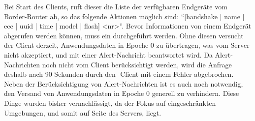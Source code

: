Bei Start des Clients, ruft dieser die Liste der verfügbaren Endgeräte vom Border-Router ab, so das folgende Aktionen möglich sind:
"`[handshake | name | ecc | uuid | time | model | flash] <nr>"'. Bevor Informationen von einem Endgerät abgerufen werden können, muss
ein  durchgeführt werden. Ohne diesen versucht der Client derzeit, Anwendungsdaten in Epoche 0 zu übertragen, was vom
Server nicht akzeptiert, und mit einer Alert-Nachricht beantwortet wird. Da Alert-Nachrichten noch nicht vom Client berücksichtigt
werden, wird die Anfrage deshalb nach 90 Sekunden durch den -Client mit einem Fehler abgebrochen. Neben der Berücksichtigung
von Alert-Nachrichten ist es auch noch notwendig, den Versand von Anwendungsdaten in Epoche 0 generell zu verhindern. Diese Dinge
wurden bisher vernachlässigt, da der Fokus auf eingeschränkten Umgebungen, und somit auf Seite des Servers, liegt.